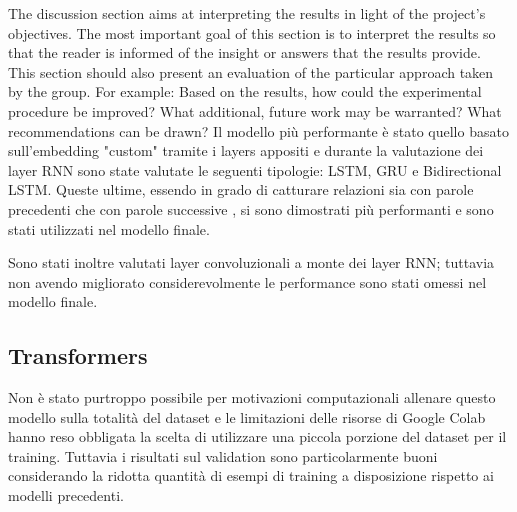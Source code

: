 The discussion section aims at interpreting the results in light of the project's objectives. The most important goal of this section is to interpret the results so that the reader is informed of the insight or answers that the results provide. This section should also present an evaluation of the particular approach taken by the group. For example: Based on the results, how could the experimental procedure be improved? What additional, future work may be warranted? What recommendations can be drawn?
Il modello più performante è stato quello basato sull'embedding "custom" tramite i layers appositi e durante la valutazione dei layer RNN sono state valutate le seguenti tipologie: LSTM, GRU e
Bidirectional LSTM. Queste ultime, essendo in grado di catturare relazioni sia
con parole precedenti che con parole successive \cite{schuster1997bidirectional}, si sono dimostrati più performanti e
sono stati utilizzati nel modello finale.

Sono stati inoltre valutati layer convoluzionali a monte dei layer RNN; tuttavia
non avendo migliorato considerevolmente le performance sono stati omessi nel
modello finale.

\subsection{Transformers}

Non è stato purtroppo possibile per motivazioni computazionali allenare questo
modello sulla totalità del dataset e le limitazioni delle risorse di Google
Colab hanno reso obbligata la scelta di utilizzare una piccola porzione del
dataset per il training. Tuttavia i risultati sul validation sono
particolarmente buoni considerando la ridotta quantità di esempi di training a
disposizione rispetto ai modelli precedenti.